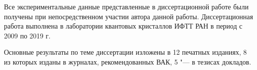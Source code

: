 {\contribution} Все экспериментальные данные представленные в диссертационной работе были получены при непосредственном участии автора данной работы. Диссертационная работа выполнена в лаборатории квантовых кристаллов ИФТТ РАН в период с 2009 по 2019 г.


     Основные результаты по теме диссертации изложены в 12 печатных изданиях, 
    8 из которых изданы в журналах, рекомендованных ВАК, 
    5 "--- в тезисах докладов.%
    

